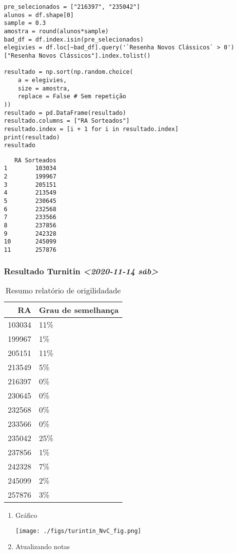 \documentclass[11pt]{article}
\begin{document}
\begin{verbatim}
pre_selecionados = ["216397", "235042"]
alunos = df.shape[0]
sample = 0.3
amostra = round(alunos*sample)
bad_df = df.index.isin(pre_selecionados)
elegivies = df.loc[~bad_df].query('`Resenha Novos Clássicos` > 0')["Resenha Novos Clássicos"].index.tolist()

resultado = np.sort(np.random.choice(
    a = elegivies,
    size = amostra,
    replace = False # Sem repetição
))
resultado = pd.DataFrame(resultado)
resultado.columns = ["RA Sorteados"]
resultado.index = [i + 1 for i in resultado.index]
print(resultado)
resultado
\end{verbatim}

\begin{verbatim}
   RA Sorteados
1        103034
2        199967
3        205151
4        213549
5        230645
6        232568
7        233566
8        237856
9        242328
10       245099
11       257876
\end{verbatim}



\subsubsection{Resultado Turnitin \textit{<2020-11-14 sáb>}}
\label{sec:org6e3b4c2}

\begin{table}[htbp]
\caption{\label{TurnitinNvC}Resumo relatório de origilidadade}
\centering
\begin{tabular}{rl}
\hline
RA & Grau de semelhança\\
\hline
103034 & 11\%\\
199967 & 1\%\\
205151 & 11\%\\
213549 & 5\%\\
216397 & 0\%\\
230645 & 0\%\\
232568 & 0\%\\
233566 & 0\%\\
235042 & 25\%\\
237856 & 1\%\\
242328 & 7\%\\
245099 & 2\%\\
257876 & 3\%\\
\hline
\end{tabular}
\end{table}

\begin{enumerate}
\item Gráfico
\label{sec:org2a53964}
\begin{center}
\texttt{[image: ./figs/turintin\_NvC\_fig.png]}
\end{center}

\item Atualizando notas
\label{sec:orge4eecdb}
\end{enumerate}
\end{document}
